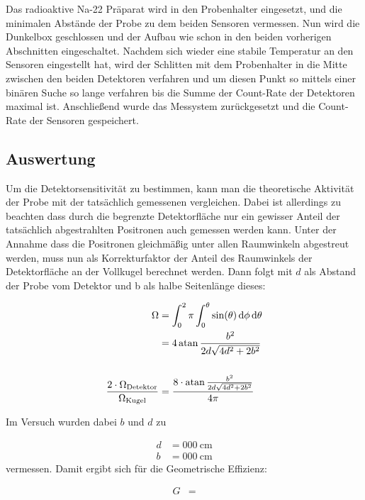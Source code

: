 \documentclass[12pt,twoside,a4paper]{scrartcl}
\begin{document}
			Das radioaktive Na-22 Präparat wird in den Probenhalter eingesetzt, und die minimalen Abstände der Probe zu dem beiden Sensoren vermessen. Nun wird die Dunkelbox geschlossen und der Aufbau wie schon in den beiden vorherigen Abschnitten eingeschaltet. Nachdem sich wieder eine stabile Temperatur an den Sensoren eingestellt hat, wird der Schlitten mit dem Probenhalter in die Mitte zwischen den beiden Detektoren verfahren und um diesen Punkt so mittels einer binären Suche so lange verfahren bis die Summe der Count-Rate der Detektoren maximal ist. Anschließend wurde das Messystem zurückgesetzt und die Count-Rate der Sensoren gespeichert.

		\subsection{Auswertung}

			Um die Detektorsensitivität zu bestimmen, kann man die theoretische Aktivität der Probe mit der tatsächlich gemessenen vergleichen.
			Dabei ist allerdings zu beachten dass durch die begrenzte Detektorfläche nur ein gewisser Anteil der tatsächlich abgestrahlten Positronen auch gemessen werden kann.
			Unter der Annahme dass die Positronen gleichmäßig unter allen Raumwinkeln abgestreut werden, muss nun als Korrekturfaktor der Anteil des Raumwinkels der Detektorfläche an der Vollkugel berechnet werden. Dann folgt mit $d$ als Abstand der Probe vom Detektor und b als halbe Seitenlänge dieses:

			\begin{align*}
				\Omega &= \int_0^2\pi \int_0^\theta \sin(\theta) \dd{\phi} \dd{\theta}\\
							 &= 4 \atan{ \frac{b^2}{2d \sqrt{4d^2 + 2b^2}}} \\
				\\
				\frac{2 \cdot \Omega_{\text{Detektor}}}{\Omega_{\text{Kugel}}} &=  \frac{8 \cdot \atan{\frac{b^2}{2d\sqrt{4d^2 + 2b^2}}}}{4 \pi}
			\end{align*}

			Im Versuch wurden dabei $b$ und $d$ zu

			\begin{align*}
					d &= \SI{000}{\centi \metre} \\
					b &= \SI{000}{\centi \metre}
			\end{align*}
			vermessen. Damit ergibt sich für die Geometrische Effizienz:

			\begin{align*}
				G &=
			\end{align*}
\end{document}
